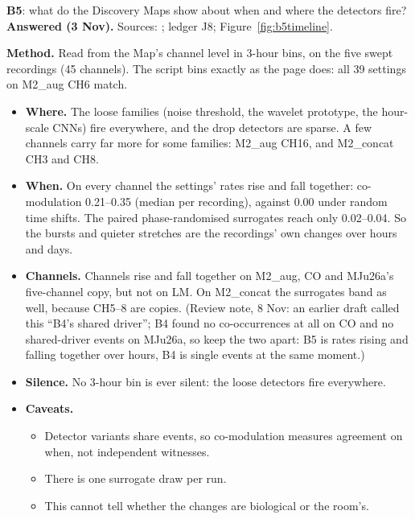 \begin{instructions}
\textbf{B5}: what do the Discovery Maps show about when and where the detectors fire? \textbf{Answered (3 Nov).}
Sources: ; ledger J8; Figure~\ref{fig:b5timeline}.

\textbf{Method.} Read from the Map's channel level in 3-hour bins, on the five swept recordings (45 channels). The
script bins exactly as the page does: all 39 settings on M2\_aug CH6 match.
\begin{itemize}
  \item \textbf{Where.} The loose families (noise threshold, the wavelet prototype, the hour-scale CNNs) fire
        everywhere, and the drop detectors are sparse. A few channels carry far more for some families: M2\_aug CH16,
        and M2\_concat CH3 and CH8.
  \item \textbf{When.} On every channel the settings' rates rise and fall together: co-modulation 0.21--0.35 (median
        per recording), against 0.00 under random time shifts. The paired phase-randomised surrogates reach only
        0.02--0.04. So the bursts and quieter stretches are the recordings' own changes over hours and days.
  \item \textbf{Channels.} Channels rise and fall together on M2\_aug, CO and MJu26a's five-channel copy, but not on
        LM. On M2\_concat the surrogates band as well, because CH5--8 are copies. (Review note, 8 Nov: an earlier draft
        called this ``B4's shared driver''; B4 found no co-occurrences at all on CO and no shared-driver events on MJu26a,
        so keep the two apart: B5 is rates rising and falling together over hours, B4 is single events at the same
        moment.)
  \item \textbf{Silence.} No 3-hour bin is ever silent: the loose detectors fire everywhere.
  \item \textbf{Caveats.}
        \begin{itemize}
          \item Detector variants share events, so co-modulation measures agreement on when, not independent
                witnesses.
          \item There is one surrogate draw per run.
          \item This cannot tell whether the changes are biological or the room's.
        \end{itemize}
\end{itemize}


\end{instructions}
